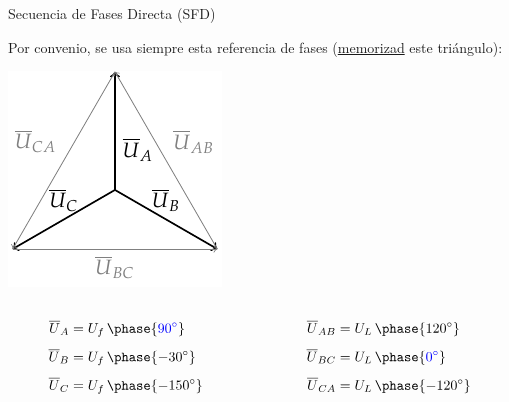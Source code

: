 \documentclass[aspectratio=169, usenames,svgnames,dvipsnames]{beamer}
\begin{document}
\begin{frame}{Secuencia de Fases Directa (SFD)} \label{diapo:triangulo_SFD}

    \vspace{3mm}
    Por \alert{convenio}, se usa siempre esta \alert{referencia} de fases (\underline{memorizad} este triángulo):

    \begin{center}
        \includegraphics[height=0.56\textheight]{../figs/FasoresTrifasica_ABC.pdf}
    \end{center}

    \vspace{-10mm}
    \begin{columns}
    \begin{column}{0.5\columnwidth}
        \begin{align*}
          \overline{U}_A &= U_f \, \phase{{\color{blue}\ang{90}}}\\[4pt]
          \overline{U}_B &= U_f \, \phase{\ang{-30}}\\[4pt]
          \overline{U}_C &= U_f \, \phase{\ang{-150}}
        \end{align*}
    \end{column} 
    \begin{column}{0.5\columnwidth}
        \begin{align*}
          \overline{U}_{AB} &= U_L \, \phase{\ang{120}}\\[4pt]
          \overline{U}_{BC} &= U_L \, \phase{{\color{blue}\ang{0}}}\\[4pt]
          \overline{U}_{CA} &= U_L \, \phase{\ang{-120}}
        \end{align*}
    \end{column}
    \end{columns}


\end{frame}
\end{document}
